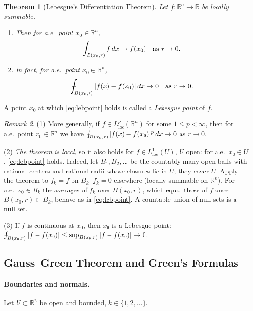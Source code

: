 \documentclass[11pt]{article}
\def\Xint#1{\mathchoice
  {\XXint\displaystyle\textstyle{#1}}%
  {\XXint\textstyle\scriptstyle{#1}}%
  {\XXint\scriptstyle\scriptscriptstyle{#1}}%
  {\XXint\scriptscriptstyle\scriptscriptstyle{#1}}%
  \!\int}
\def\XXint#1#2#3{{\setbox0=\hbox{$#1{#2#3}{\int}$}
  \vcenter{\hbox{$#2#3$}}\kern-.5\wd0}}
\def\fint{\Xint-}
\theoremstyle{plain}
\newtheorem{theorem}{Theorem}[section]
\theoremstyle{definition}
\theoremstyle{remark}
\newtheorem{remark}[theorem]{Remark}
\begin{document}
\begin{theorem}[Lebesgue's Differentiation Theorem]\label{thm:lebesgue}
Let $f : \mathbb{R}^n \to \mathbb{R}$ be locally summable.
\begin{enumerate}
    \item[(i)] Then for a.e.\ point $x_0 \in \mathbb{R}^n$,
    $$ \fint_{B(x_0,r)} f\, dx \to f(x_0) \quad \text{as } r \to 0. $$
    \item[(ii)] In fact, for a.e.\ point $x_0 \in \mathbb{R}^n$,
    \begin{equation}\label{eq:lebpoint}
    \fint_{B(x_0,r)} |f(x) - f(x_0)|\, dx \to 0 \quad \text{as } r \to 0.
    \end{equation}
\end{enumerate}
\end{theorem}
A point $x_0$ at which \eqref{eq:lebpoint} holds is called a \emph{Lebesgue point} of $f$.

\begin{remark}
(1) More generally, if $f \in L^p_{\mathrm{loc}}(\mathbb{R}^n)$ for some $1 \leq p < \infty$, then for a.e.\ point $x_0 \in \mathbb{R}^n$ we have $\fint_{B(x_0,r)} |f(x) - f(x_0)|^p\, dx \to 0$ as $r \to 0$.

(2) \emph{The theorem is local}, so it also holds for $f \in L^1_{\mathrm{loc}}(U)$, $U$ open: for a.e.\ $x_0 \in U$, \eqref{eq:lebpoint} holds. Indeed, let $B_1, B_2, \dots$ be the countably many open balls with rational centers and rational radii whose closures lie in $U$; they cover $U$. Apply the theorem to $f_k = f$ on $B_k$, $f_k = 0$ elsewhere (locally summable on $\mathbb{R}^n$). For a.e.\ $x_0 \in B_k$ the averages of $f_k$ over $B(x_0,r)$, which equal those of $f$ once $B(x_0,r) \subset B_k$, behave as in \eqref{eq:lebpoint}. A countable union of null sets is a null set.

(3) If $f$ is continuous at $x_0$, then $x_0$ is a Lebesgue point: $\fint_{B(x_0,r)}|f - f(x_0)| \leq \sup_{B(x_0,r)}|f - f(x_0)| \to 0$.
\end{remark}

\subsection{Gauss--Green Theorem and Green's Formulas}\label{ssec:green}

\paragraph{Boundaries and normals.} Let $U \subset \mathbb{R}^n$ be open and bounded, $k \in \{1,2,\dots\}$.
\end{document}
